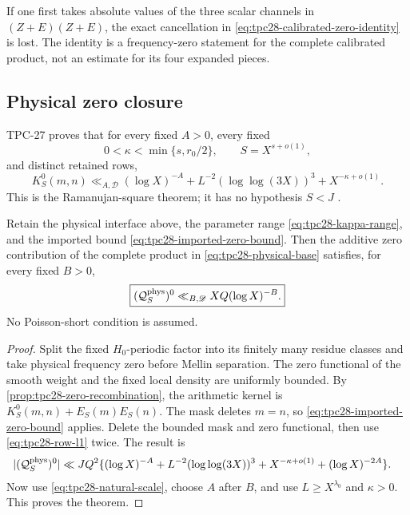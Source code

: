 \begin{remark}
\label{rem:tpc28-zero-order}
If one first takes absolute values of the three scalar channels in
$(Z+E)(Z+E)$, the exact cancellation in
\eqref{eq:tpc28-calibrated-zero-identity} is lost.  The identity is a
frequency-zero statement for the complete calibrated product, not an
estimate for its four expanded pieces.
\end{remark}

\subsection{Physical zero closure}

TPC-27 proves that for every fixed $A>0$, every fixed
\begin{equation}
 0<\kappa<\min\{s,r_0/2\},
 \qquad S=X^{s+o(1)},
 \label{eq:tpc28-kappa-range}
\end{equation}
and distinct retained rows,
\begin{equation}
 K_S^0(m,n)
 \ll_{A,\mathscr D}
 (\log X)^{-A}
 +L^{-2}(\log\log(3X))^3
 +X^{-\kappa+o(1)}.
 \label{eq:tpc28-imported-zero-bound}
\end{equation}
This is the Ramanujan-square theorem; it has no hypothesis $S<J$
\citep{WangTPC27}.

\begin{theorem}
\label{thm:tpc28-physical-zero}
Retain the physical interface above, the parameter range
\eqref{eq:tpc28-kappa-range}, and the imported bound
\eqref{eq:tpc28-imported-zero-bound}.  Then the additive zero
contribution of the complete product in
\eqref{eq:tpc28-physical-base} satisfies, for every fixed $B>0$,
\begin{equation}
 \boxed{
 (\mathcal Q_S^{\rm phys})^0
 \ll_{B,\mathscr D}XQ(\log X)^{-B}.}
 \label{eq:tpc28-physical-zero-closure}
\end{equation}
No Poisson-short condition is assumed.
\end{theorem}

\begin{proof}
Split the fixed $H_0$-periodic factor into its finitely many residue
classes and take physical frequency zero before Mellin separation.
The zero functional of the smooth weight and the fixed local density
are uniformly bounded.  By
\cref{prop:tpc28-zero-recombination}, the arithmetic kernel is
$K_S^0(m,n)+E_S(m)E_S(n)$.  The mask deletes $m=n$, so
\eqref{eq:tpc28-imported-zero-bound} applies.  Delete the bounded mask
and zero functional, then use \eqref{eq:tpc28-row-l1} twice.  The
result is
\begin{align*}
 |(\mathcal Q_S^{\rm phys})^0|
 \ll JQ^2\{&(\log X)^{-A}
 +L^{-2}(\log\log(3X))^3
 +X^{-\kappa+o(1)}
 +(\log X)^{-2A}\}.
\end{align*}
Now use \eqref{eq:tpc28-natural-scale}, choose $A$ after $B$, and
use $L\ge X^{\lambda_0}$ and $\kappa>0$.  This proves the theorem.
\end{proof}
